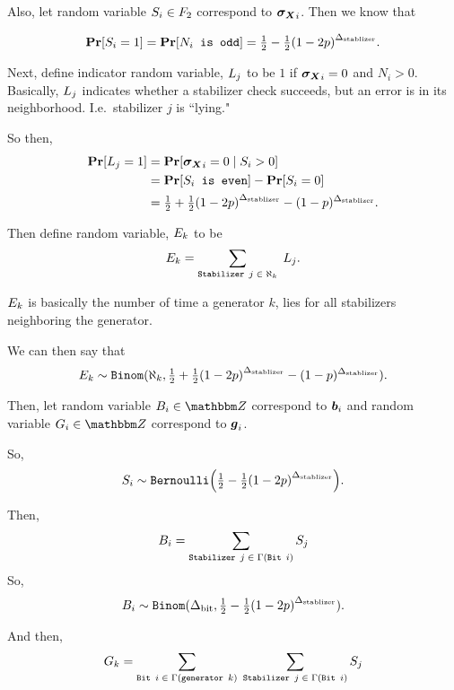 Also, let random variable $S_i \in F_2$ correspond  to $\boldsymbol{\boldsymbol{\sigma_X}}_i$. Then we know that

\newcommand{\SPr}{\half - \half\mleft(1-2p\mright)^\DegStable}
\begin{align*}
	\Pr[S_i = 1] = \Pr\mleft[\texttt{$N_i$ is odd}\mright] = \SPr.
\end{align*}

Next, define indicator random variable, $L_j$ to be $1$ if $\boldsymbol{\boldsymbol{\sigma_X}}_i = 0$ and $N_i > 0$.
Basically, $L_j$ indicates whether a stabilizer check succeeds, but an error is in
its neighborhood. I.e.\ stabilizer $j$ is ``lying."

\newcommand{\LyingIndivPr}{\half + \half \mleft( 1 - 2p\mright)^\DegStable - (1-p)^\DegStable}

So then,
\begin{align*}
	\Pr[L_j = 1] &= \Pr\mleft[\synd_i = 0\; \middle|\; S_i > 0\mright] \\
		&= \Pr[\texttt{$S_i$ is even}] - \Pr[S_i = 0] \\
		&= \LyingIndivPr.
\end{align*}


Then define random variable, $E_k$ to be
$$
	E_k = 
		\sum_{\texttt{Stabilizer $j$} \; \in \; \aleph_k}\;
				L_j.
$$

$E_k$ is basically the number of time a generator $k$, lies for all
stabilizers neighboring the generator.

We can then say that
$$
	\lyingGenerator_k \sim \texttt{Binom}(\aleph_k, \LyingIndivPr).
$$



Then, let random variable $\bitscoreRV_i \in \Z$ correspond to $\boldsymbol{b}_i$ and random variable $\generatorscoreRV_i \in \Z$
correspond to $\boldsymbol{g}_i$. 


So,
$$
	\syndromeRV_i \sim \texttt{Bernoulli}\mleft(\SPr\mright).
$$

Then,
$$
	B_i = \sum_{\texttt{Stabilizer $j$} \; \in \; \Gamma(\texttt{Bit $i$})} S_j
$$
So, 
$$
	\bitscoreRV_i \sim \texttt{Binom}(\DegBit, \SPr).
$$

And then,
$$
	G_k =
		\sum_{\texttt{Bit $i$} \; \in \; \Gamma(\texttt{generator } k)}\;
			\sum_{\texttt{Stabilizer } j \; \in \; \Gamma(\texttt{Bit } i)}
				S_j
$$

